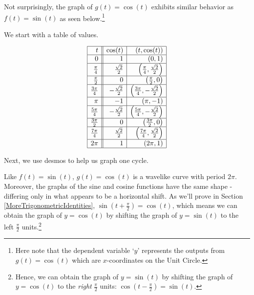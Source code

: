 \documentclass{ximera}
\begin{document}
Not surprisingly, the graph of $g(t) = \cos(t)$ exhibits similar behavior as $f(t) = \sin(t)$ as seen below.\footnote{Here note that the dependent variable `$y$' represents the outputs from  $g(t) = \cos(t)$ which are $x$-coordinates on the Unit Circle.}  

We start with a table of values.

\[ \begin{array}{|r||r|r|}  \hline
t & \cos(t) & (t,\cos(t)) \\ \hline
0  & 1 & (0, 1) \\ \hline
\frac{\pi}{4}  & \frac{\sqrt{2}}{2} & \left(\frac{\pi}{4}, \frac{\sqrt{2}}{2}\right) \\ \hline 
\frac{\pi}{2}  & 0 & \left(\frac{\pi}{2}, 0\right) \\ \hline 
\frac{3\pi}{4}  & -\frac{\sqrt{2}}{2} & \left(\frac{3\pi}{4}, -\frac{\sqrt{2}}{2}\right) \\ \hline 
\pi & -1 & (\pi, -1) \\ \hline 
\frac{5\pi}{4}  & -\frac{\sqrt{2}}{2} & \left(\frac{5\pi}{4}, -\frac{\sqrt{2}}{2}\right) \\ \hline 
\frac{3\pi}{2}  & 0 & \left(\frac{3\pi}{2}, 0 \right) \\ \hline 
\frac{7\pi}{4}  & \frac{\sqrt{2}}{2} & \left(\frac{7\pi}{4}, \frac{\sqrt{2}}{2}\right) \\ \hline 
2\pi  & 1 & (2\pi, 1) \\ \hline
\end{array} \]


Next, we use desmos to help us graph one cycle.

\begin{center}
\end{center}


Like $f(t)=\sin(t)$, $g(t) = \cos(t)$ is a wavelike curve with period $2\pi$.   Moreover, the graphs of the sine and cosine functions have the same shape -  differing only in what appears to be a horizontal shift.  As we'll prove in Section \ref{MoreTrigonometricIdentities}, $\sin\left(t + \frac{\pi}{2}\right) = \cos(t)$, which means we can obtain the graph of $y=\cos(t)$ by shifting the graph of $y=\sin(t)$ to the left $\frac{\pi}{2}$ units.\footnote{Hence, we can obtain the graph of $y = \sin(t)$ by shifting the graph of $y = \cos(t)$ to the \textit{right} $\frac{\pi}{2}$ units: $\cos\left(t - \frac{\pi}{2} \right) = \sin(t)$.}

\begin{center}
\end{center}
\end{document}
